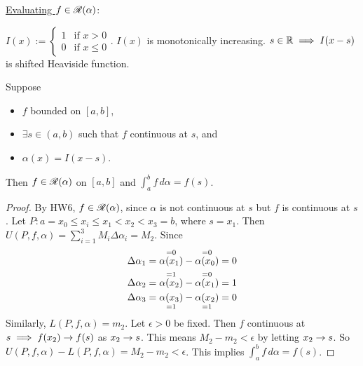 \documentclass[]{article}
\begin{document}
\ul{Evaluating $f\in\mathscr{R}(\alpha)$}:
\begin{definition}
	$I(x) := \begin{cases} 1 & \text{if } x>0 \\ 0 & \text{if } x\leq 0 \end{cases}$.
	$I(x)$ is monotonically increasing.
	$s\in\mathbb{R}\implies I(x-s)$ is shifted Heaviside function.
\end{definition}
\begin{theorem}
	\label{thm-6-15}
	Suppose
	\begin{itemize}
		\item $f$ bounded on $[a,b]$,
		\item $\exists s\in(a,b)$ such that $f$ continuous at $s$, and
		\item $\alpha(x) = I(x-s)$.
	\end{itemize}
	Then $f\in\mathscr{R}(\alpha)$ on $[a,b]$ and $\int_a^b f\,d\alpha = f(s)$.
\end{theorem}
\begin{proof}
	By HW6, $f\in\mathscr{R}(\alpha)$, since $\alpha$ is not continuous at $s$ but $f$ is continuous at $s$.
	Let $P: a=x_0 \leq x_i \leq x_1 < x_2 < x_3= b$, where $s=x_1$.
	Then $U(P,f,\alpha) = \sum_{i=1}^3 M_i\Delta\alpha_i = M_2$. Since
	\begin{align*}
		\Delta\alpha_1 &= \overset{=0}{\alpha(x_1)} - \overset{=0}{\alpha(x_0)} = 0 \\
		\Delta\alpha_2 &= \overset{=1}{\alpha(x_2)} - \overset{=0}{\alpha(x_1)} = 1 \\
		\Delta\alpha_3 &= \underset{=1}{\alpha(x_3)} - \underset{=1}{\alpha(x_2)} = 0
	\end{align*}
	Similarly, $L(P,f,\alpha) = m_2$.
	Let $\epsilon>0$ be fixed.
	Then $f$ continuous at $s \implies f(x_2)\rightarrow f(s)$ as $x_2\rightarrow s$.
	This means $M_2-m_2 < \epsilon$ by letting $x_2\rightarrow s$.
	So $U(P,f,\alpha) - L(P,f,\alpha) = M_2-m_2 <\epsilon$.
	This implies $\int_a^bf\,d\alpha = f(s)$.
\end{proof}
\end{document}
